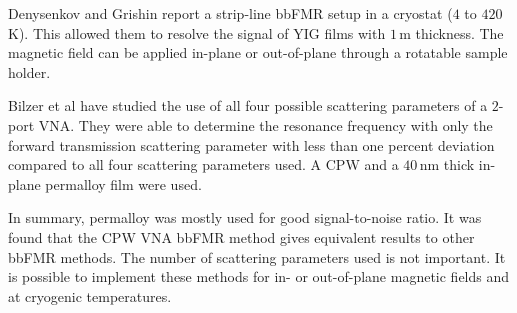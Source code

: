 Denysenkov and Grishin report a strip-line bbFMR setup in a cryostat ($4$ to $420\,$K). This allowed them to resolve the signal of YIG films with $1\,$\textmu m thickness. The magnetic field can be applied in-plane or out-of-plane through a rotatable sample holder. \cite{Denysenkov2003}

Bilzer et al have studied the use of all four possible scattering parameters of a $2$-port VNA. They were able to determine the resonance frequency with only the forward transmission scattering parameter with less than one percent deviation compared to all four scattering parameters used. A CPW and a $40\,$nm thick in-plane permalloy film were used. \cite{Bilzer2007}

In summary, permalloy was mostly used for good signal-to-noise ratio. It was found that the CPW VNA bbFMR method gives equivalent results to other bbFMR methods. The number of scattering parameters used is not important. It is possible to implement these methods for in- or out-of-plane magnetic fields and at cryogenic temperatures.
